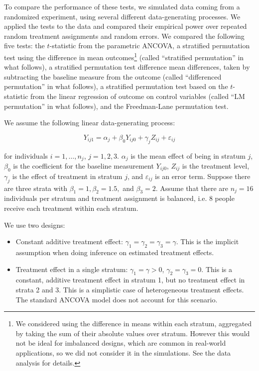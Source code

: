 \documentclass[11pt]{article}
\begin{document}
To compare the performance of these tests, we simulated data coming from a randomized experiment, using several different data-generating processes.
We applied the tests to the data and compared their empirical power over repeated random treatment assignments and random errors.
We compared the following five tests:
the $t$-statistic from the parametric ANCOVA,
a stratified permutation test using the difference in mean outcomes\footnote{ We considered using the difference in means within each stratum, aggregated by taking the sum of their absolute values over stratum. However this would not be ideal for imbalanced designs, which are common in real-world applications, so we did not consider it in the simulations.  See the data analysis for details.}
 (called ``stratified permutation'' in what follows),
a stratified permutation test difference mean differences, taken by subtracting the baseline measure from the outcome (called ``differenced permutation'' in what follows),
a stratified permutation test based on the $t$-statistic from the linear regression of outcome on control variables (called ``LM permutation'' in what follows),
and the Freedman-Lane permutation test.
 

We assume the following linear data-generating process:

\begin{equation}\label{eqn:dgp}
Y_{ij1} =\alpha_j + \beta_0Y_{ij0} + \gamma_j Z_{ij} + \varepsilon_{ij}
\end{equation}

\noindent for individuals $i = 1, \dots, n_j$, $j = 1, 2, 3$.
$\alpha_j$ is the mean effect of being in stratum $j$, 
$\beta_0$ is the coefficient for the baseline measurement $Y_{ij0}$, 
$Z_{ij}$ is the treatment level, 
$\gamma_j$ is the effect of treatment in stratum $j$, 
and $\varepsilon_{ij}$ is an error term.
Suppose there are three strata with $\beta_1 = 1, \beta_2 = 1.5,$ and $\beta_3 = 2$.
Assume that there are $n_j = 16$ individuals per stratum and treatment assignment is balanced, i.e. 8 people receive each treatment within each stratum.

We use two designs:
\begin{itemize}
\item Constant additive treatment effect: $\gamma_1 = \gamma_2 = \gamma_3 = \gamma$. This is the implicit assumption when doing inference on estimated treatment effects.
\item Treatment effect in a single stratum: $\gamma_1 = \gamma > 0$, $\gamma_2 = \gamma_3 = 0$. This is a constant, additive treatment effect in stratum 1, but no treatment effect in strata 2 and 3. This is a simplistic case of heterogeneous treatment effects. The standard ANCOVA model does not account for this scenario.
\end{itemize}
\end{document}

